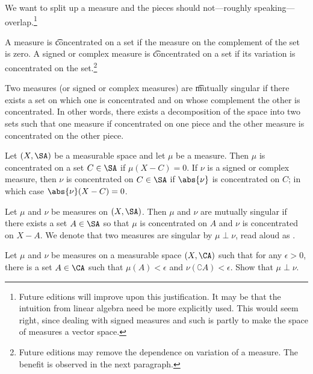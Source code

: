 

We want to split up a measure and the pieces should not---roughly speaking---overlap.\footnote{Future editions will improve upon this justification. It may be that the intuition from linear algebra need be more explicitly used. This would seem right, since dealing with signed measures and such is partly to make the space of measures a vector space.}


A measure is \t{concentrated} on a set if the measure on the complement of the set is zero.
A signed or complex measure is \t{concentrated} on a set if its variation is concentrated on the set.\footnote{Future editions may remove the dependence on variation of a measure. The benefit is observed in the next paragraph.}

Two measures (or signed or complex measures) are \t{mutually singular} if there exists a set on which one is concentrated and on whose complement the other is concentrated.
In other words, there exists a decomposition of the space into two sets such that one measure if concentrated on one piece and the other measure is concentrated on the other piece.


Let $(X, \SA)$ be a measurable space and let $\mu$ be a measure.
Then $\mu$ is concentrated on a set $C \in \SA$ if $\mu(X - C) = 0$.
If $\nu$ is a signed or complex measure, then $\nu$ is concentrated on $C \in \SA$ if $\abs{\nu}$ is concentrated on $C$; in which case $\abs{\nu}(X - C) = 0$.

Let $\mu$ and $\nu$ be measures on $(X, \SA)$.
Then $\mu$ and $\nu$ are mutually singular if there exists a set $A\in\SA$ so that $\mu$ is concentrated on $A$ and $\nu$ is concentrated on $X - A$.
We denote that two measures are singular by $\mu \perp \nu$, read aloud as .


\begin{exercise}
  Let $\mu$ and $\nu$ be measures on a measurable space $(X, \CA)$ such that for any $\epsilon > 0$, there is a set $A \in \CA$ such that $\mu(A) < \epsilon$ and $\nu(\complement{A}) < \epsilon$. Show that $\mu \perp \nu$.
\end{exercise}
